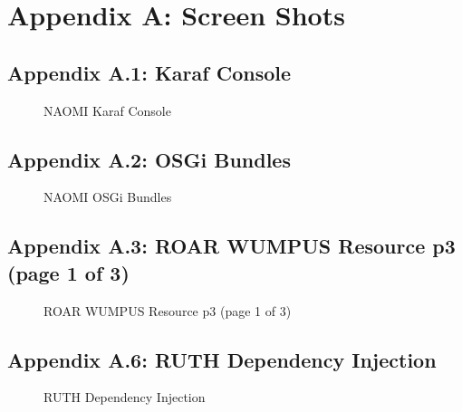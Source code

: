 \documentclass{article}[11pt]
\begin{document}
\doublespacing
\section{Appendix A: Screen Shots}

\subsection{Appendix A.1: Karaf Console}
\begin{figure}[h]
\begin{center}
\end{center}
\caption{NAOMI Karaf Console}
\label{fig:naomi-karaf-console}
\end{figure}
\newline
\newpage

\subsection{Appendix A.2: OSGi Bundles}
\begin{figure}[h]
\begin{center}
\end{center}
\caption{NAOMI OSGi Bundles}
\label{fig:naomi-osgi-bundles}
\end{figure}
\newline
\newpage

\subsection{Appendix A.3: ROAR WUMPUS Resource p3 (page 1 of 3)}
\begin{figure}[h]
\begin{center}
\end{center}
\caption{ROAR WUMPUS Resource p3 (page 1 of 3)}
\label{fig:roar-wumpus-resource-p3-page1}
\end{figure}
\newline
\newpage

\subsection{Appendix A.6: RUTH Dependency Injection}
\begin{figure}[h]
\begin{center}
\end{center}
\caption{RUTH Dependency Injection}
\label{fig:ruth-dependency-injection}
\end{figure}
\newline
\newpage
\end{document}

